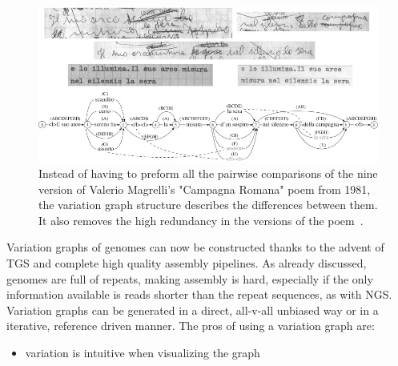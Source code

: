 \begin{figure}[h!]
	\centering
	\includegraphics[width=.95\linewidth]{figures/background/variant_graph.jpg}
	\caption[The Variation Graph origin.]{Instead of having to preform all the pairwise comparisons of the nine version of Valerio Magrelli's "Campagna Romana" poem from 1981, the variation graph structure describes the differences between them. It also removes the high redundancy in the versions of the poem~\cite{variant_graph,garrison_pangenome}.}
	\label{fig:campagna_romana}
\end{figure}
Variation graphs of genomes can now be constructed thanks to the advent of TGS and complete high quality assembly pipelines. As already discussed, genomes are full of repeats, making assembly is hard, especially if the only information available is reads shorter than the repeat sequences, as with NGS.\\
Variation graphs can be generated in a direct, all-v-all unbiased way or in a iterative, reference driven manner.
The pros of using a variation graph are:
\begin{itemize}
	\item variation is intuitive when visualizing the graph
\end{itemize}



